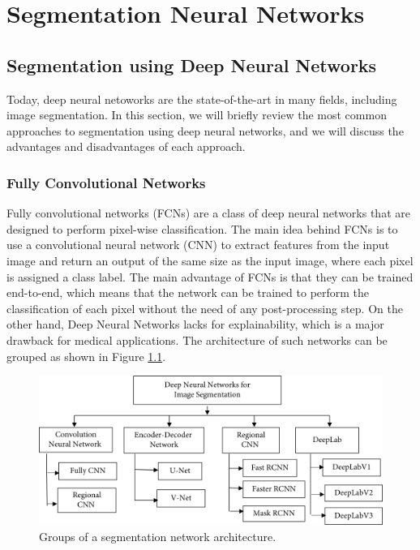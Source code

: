 
\chapter{Segmentation Neural Networks}

\label{chp:cbct}

\def\:{\hskip0pt} %

\section{Segmentation using Deep Neural Networks}
\label{sec:segmentation}
Today, deep neural netoworks are the state-of-the-art in many fields, including
image segmentation. In this section, we will briefly review the most common
approaches to segmentation using deep neural networks, and we will discuss the
advantages and disadvantages of each approach.

\subsection{Fully Convolutional Networks}
\label{sec:fcn}
Fully convolutional networks (FCNs) are a class of deep neural networks that
are designed to perform pixel-wise classification. The main idea behind FCNs is
to use a convolutional neural network (CNN) to extract features from the input
image and return an output of the same size as the input image, where each
pixel is assigned a class label. The main advantage of FCNs is that they can be
trained end-to-end, which means that the network can be trained to perform the
classification of each pixel without the need of any post-processing step. On
the other hand, Deep Neural Networks lacks for explainability, which is a major
drawback for medical applications.
The architecture of such networks can be grouped as shown in Figure \ref{fig:fcn_architecture}.
\begin{figure}[ht]
  \centering
  \includegraphics[width=0.8\linewidth]{Images/seg-arch.png}
  \caption{Groups of a segmentation network architecture.}
  \label{fig:fcn_architecture}
\end{figure}

